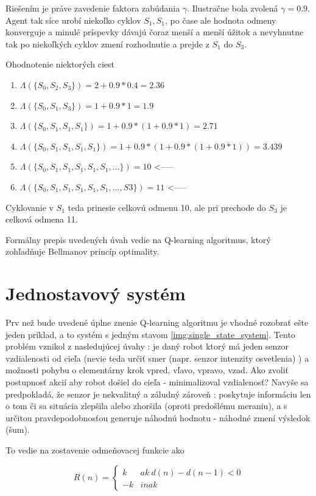 Riešením je práve zavedenie faktora zabúdania $\gamma$. Ilustračne
bola zvolená $\gamma = 0.9$. Agent tak síce urobí niekoľko cyklov $S_1, S_1$,
po čase ale hodnota odmeny konverguje a minulé príspevky dávajú čoraz menší
a menší úžitok a nevyhnutne tak po niekoľkých cyklov zmení rozhodnutie a prejde
z $S_1$ do $S_3$.

Ohodnotenie niektorých ciest
\begin{enumerate}
  \item $\Lambda(\{S_0, S_2, S_3\}) = 2 + 0.9*0.4 = 2.36$
  \item $\Lambda(\{S_0, S_1, S_3\}) = 1 + 0.9*1 = 1.9$
  \item $\Lambda(\{S_0, S_1, S_1, S_1\}) = 1 + 0.9*(1 + 0.9*1) = 2.71 $
  \item $\Lambda(\{S_0, S_1, S_1, S_1, S_1\}) = 1 + 0.9*(1 + 0.9*(1 + 0.9*1)) = 3.439$
  \item $\Lambda(\{S_0, S_1, S_1, S_1, S_1, S_1, ...\}) = 10$ <-----
  \item $\Lambda(\{S_0, S_1, S_1, S_1, S_1, S_1, ..., S3\}) = 11$ <-----
\end{enumerate}

Cyklovanie v $S_1$ teda prinesie celkovú odmenu 10, ale pri prechode do $S_3$ je celková
odmena 11.

Formálny prepis uvedených úvah vedie na Q-learning algoritmus, ktorý zohľadňuje Bellmanov princíp optimality.


\section{Jednostavový systém}

Prv než bude uvedené úplne znenie Q-learning algoritmu je vhodné rozobrať ešte
jeden príklad, a to systém s jedným stavom \ref{img:single_state_system}.
Tento problém vznikol z nasledujúcej úvahy : je daný robot ktorý má jeden senzor
vzdialenosti od cieľa (nevie teda určiť smer (napr. senzor intenzity osvetlenia) ) a možnosti pohybu o elementárny krok
vpred, vľavo, vpravo, vzad. Ako zvoliť postupnosť akcií aby robot došiel do cieľa - minimalizoval vzdialenosť?
Navyše sa predpokladá, že senzor je nekvalitný a záludný zároveň : poskytuje
informáciu len o tom či sa situácia zlepšila alebo zhoršila (oproti predošlému meraniu),
a s určitou pravdepodobnosťou generuje náhodnú hodnotu - náhodné zmení výsledok (šum).

To vedie na zostavenie odmeňovacej funkcie ako

\begin{equation}
R(n) =
\left\{
	\begin{array}{ll}
		k  & ak \ d(n) - d(n-1) < 0 \\
    -k & inak
	\end{array}
\right.
\label{eq:q_nano_r_func_simple}
\end{equation}

